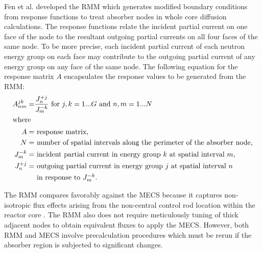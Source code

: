 
Fen et al. \cite{fen_modelling_1992} developed the \gls{RMM} which generates modified boundary
conditions from response functions to treat absorber nodes in whole core diffusion calculations.
The response functions relate the incident partial current on one face of the node to the resultant
outgoing partial currents on all four faces of the same node. To be more precise, each incident
partial current of each neutron energy group on each face may contribute to the outgoing partial
current of any energy group on any face of the same node. The following equation for the response
matrix $A$ encapsulates the response values to be generated from the \gls{RMM}:
%
\begin{align}
  A^{jk}_{nm} =& \frac{J^{+j}_n}{J^{-k}_m} \mbox{ for } j,k=1...G \mbox{ and } n,m=1...N
  \label{eq:rmm} \\
  \shortintertext{where}
  A =& \mbox{ response matrix,} \nonumber \\
  N =& \mbox{ number of spatial intervals along the perimeter of the absorber node,} \nonumber \\
  J^{-k}_m =& \mbox{ incident partial current in energy group $k$ at spatial interval $m$,}
    \nonumber \\
  J^{+j}_n =& \mbox{ outgoing partial current in energy group $j$ at spatial interval $n$}
    \nonumber \\
  &\mbox{ in response to $J^{-k}_m$.} \nonumber
\end{align}

The \gls{RMM} compares favorably against the \gls{MECS} because it captures non-isotropic flux
effects arising from the non-central control rod location within the reactor core
\cite{fen_modelling_1992}. The \gls{RMM} also does not require
meticulously tuning of thick adjacent nodes to obtain equivalent fluxes to apply the \gls{MECS}.
However, both \gls{RMM} and \gls{MECS} involve precalculation procedures which must be rerun if the
absorber region is subjected to significant changes.

